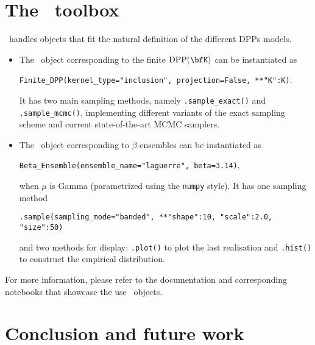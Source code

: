 \documentclass[twoside,11pt]{article}
\begin{document}


\section{The \DPPy\ toolbox} %
\label{sec:the_dppy_toolbox}

  \DPPy\ handles objects that fit the natural definition of the different DPPs models.
  \begin{itemize}
	  \item The \DPPy\ object corresponding to the finite $\DPP(\bfK)$ can be instantiated as
	  \begin{nscenter}
	  	\texttt{Finite_DPP(kernel_type="inclusion", projection=False, **{"K":K})}.
	  \end{nscenter}
		It has two main sampling methods, namely \texttt{.sample_exact()} and \texttt{.sample_mcmc()}, implementing different variants of the exact sampling scheme and current state-of-the-art MCMC samplers.

		\item The \DPPy\ object corresponding to $\beta$-ensembles can be instantiated as
		\begin{nscenter}
			\texttt{Beta_Ensemble(ensemble_name="laguerre", beta=3.14)},
		\end{nscenter}
		when $\mu$ is Gamma (parametrized using the \texttt{numpy} style).
		It has one sampling method
		\begin{nscenter}
			\texttt{.sample(sampling_mode="banded", **{"shape":10, "scale":2.0, "size":50})}
		\end{nscenter}
		and two methods for display: \texttt{.plot()} to plot the last realisation and \texttt{.hist()} to construct the empirical distribution.

  \end{itemize}
  For more information, please refer to the documentation and corresponding  notebooks that showcase the use \DPPy\ objects.




\section{Conclusion and future work} %
\label{sec:conclusion_and_future_work}
\end{document}

